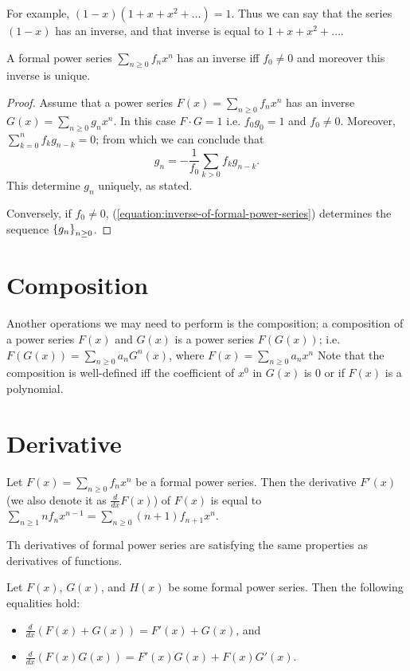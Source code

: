 For example, $(1 - x) (1 + x + x^2 + \dots) = 1$. Thus we can say that the
series $(1 - x)$ has an inverse, and that inverse is equal to $1 + x + x^2 +
\dots$.
\begin{theorem}
  A formal power series $\sum_{n \ge 0} f_n x^n$ has an inverse iff
  $f_0 \neq 0$ and moreover this inverse is unique.
\end{theorem}
\begin{proof}
  Assume that a power series $F(x) = \sum_{n \ge 0} f_n x^n$ has an inverse
  $G(x) = \sum_{n \ge 0} g_n x^n$. In this case $F \cdot G = 1$ i.e.
  $f_0 g_0 = 1$ and $f_0 \neq 0$. Moreover,
  $\sum_{k = 0}^n f_k g_{n - k} = 0$; from which we can conclude that
  \begin{equation}
    \label{equation:inverse-of-formal-power-series}
    g_n = -\frac{1}{f_0} \sum_{k > 0} f_k g_{n - k}.
  \end{equation}
  This determine $g_n$ uniquely, as stated.

  Conversely, if $f_0 \neq 0$, (\ref{equation:inverse-of-formal-power-series})
  determines the sequence $\set{g_n}_{n \ge 0}$.
\end{proof}

\section{Composition}
Another operations we may need to perform is the composition; a composition of
a power series $F(x)$ and $G(x)$ is a power series $F(G(x))$; i.e.
$F(G(x)) = \sum_{n \ge 0} a_n G^n(x)$, where $F(x) = \sum_{n \ge 0} a_n x^n$
Note that the composition is well-defined iff the coefficient of $x^0$ in $G(x)$
is $0$ or if $F(x)$ is a polynomial.

\section{Derivative}
Let $F(x) = \sum_{n \ge 0} f_n x^n$ be a formal power series. Then the
derivative $F'(x)$ (we also denote it as $\frac{d}{dx} F(x)$) of $F(x)$ is
equal to
$\sum_{n \ge 1} n f_n x^{n - 1} = \sum_{n \ge 0} (n + 1) f_{n + 1} x^n$.

Th derivatives of formal power series are satisfying the same properties as
derivatives of functions.
\begin{theorem}
  Let $F(x)$, $G(x)$, and $H(x)$ be some formal power series. Then the following
  equalities hold:
  \begin{itemize}
    \item $\frac{d}{dx}(F(x) + G(x)) = F'(x) + G(x)$, and
    \item $\frac{d}{dx}(F(x) G(x)) = F'(x)G(x) + F(x)G'(x)$.
  \end{itemize}
\end{theorem}

